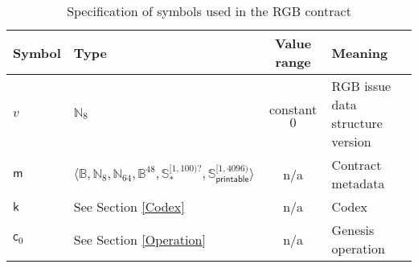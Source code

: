 \documentclass[9pt,oneside]{amsart}
\begin{document}
\begin{table}[h]
\centering
\caption{Specification of symbols used in the RGB contract}\label{tab:contract}
\begin{tabular}{ l l c l }
\toprule
Symbol & Type & Value range & Meaning \\
\midrule
$v$ & $\mathbb{N}_8$ & constant $0$ & RGB issue data structure version \\
$\mathsf{m}$   & $\langle \mathbb{B}, \mathbb{N}_8, \mathbb{N}_{64}, \mathbb{B}^{48}, \mathbb{S}_*^{[1, 100)?}, \mathbb{S}_\mathsf{printable}^{[1, 4096)} \rangle$ & n/a & Contract metadata \\
$\mathsf{k}$   & See Section \ref{Codex} & n/a & Codex \\
$\mathsf{c}_0$ & See Section \ref{Operation} & n/a & Genesis operation \\
\bottomrule
\end{tabular}
\end{table}
\end{document}
